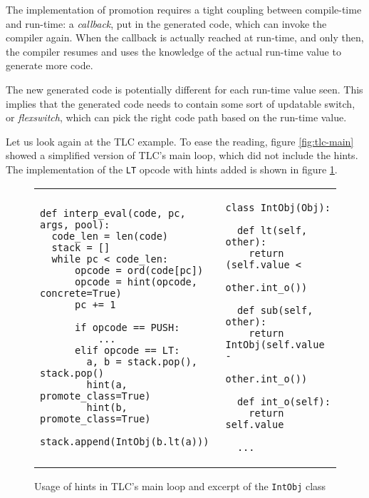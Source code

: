 The implementation of promotion requires a tight coupling between
compile-time and run-time: a \emph{callback}, put in the generated code,
which can invoke the compiler again.  When the callback is actually
reached at run-time, and only then, the compiler resumes and uses the
knowledge of the actual run-time value to generate more code.

The new generated code is potentially different for each run-time value
seen.  This implies that the generated code needs to contain some sort
of updatable switch, or \emph{flexswitch}, which can pick the right code path based on the
run-time value.

Let us look again at the TLC example.  To ease the reading, figure
\ref{fig:tlc-main} showed a simplified version of TLC's main loop, which did
not include the hints.  The implementation of the \lstinline{LT} opcode with
hints added is shown in figure \ref{fig:tlc-main-hints}.

\begin{figure}[h]
\begin{center}
\begin{tabular}{l|l}
\begin{lstlisting}
def interp_eval(code, pc, args, pool):
  code_len = len(code)
  stack = []
  while pc < code_len:
      opcode = ord(code[pc])
      opcode = hint(opcode, concrete=True)
      pc += 1

      if opcode == PUSH:
          ...
      elif opcode == LT:
        a, b = stack.pop(), stack.pop()
        hint(a, promote_class=True)
        hint(b, promote_class=True)
        stack.append(IntObj(b.lt(a)))
\end{lstlisting}
&
\hspace{2pt}
\begin{lstlisting}
class IntObj(Obj):

  def lt(self, other): 
    return (self.value < 
            other.int_o())

  def sub(self, other):
    return IntObj(self.value -
                  other.int_o())

  def int_o(self):
    return self.value

  ...
\end{lstlisting}
\end{tabular}
\end{center}
\caption{Usage of hints in TLC's main loop and excerpt of the \lstinline{IntObj} class}
\label{fig:tlc-main-hints}
\end{figure}

